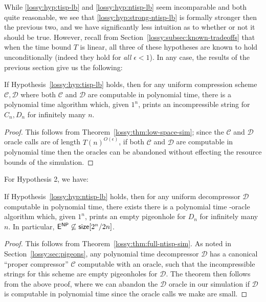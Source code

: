 While \ref{lossy:hyp:tisp-lb} and \ref{lossy:hyp:ntisp-lb} seem incomparable and both quite reasonable, we see that \ref{lossy:hyp:strong-ntisp-lb} is formally stronger then the previous two, and we have significantly less intuition as to whether or not it should be true. However, recall from Section~\ref{lossy:subsec:known-tradeoffs} that when the time bound $T$ is linear, all three of these hypotheses are known to hold unconditionally (indeed they hold for \emph{all} $\epsilon < 1$). In any case, the results of the previous section give us the following:
\begin{theorem}\label{lossy:thm:tisp-impl}
If Hypothesis~\ref{lossy:hyp:tisp-lb} holds, then for any uniform compression scheme $\mathcal{C},\mathcal{D}$ where both $\mathcal{C}$ and $\mathcal{D}$ are computable in polynomial time, there is a polynomial time algorithm which, given $1^n$, prints an incompressible string for $C_n,D_n$ for infinitely many $n$.
\end{theorem}
\begin{proof}
This follows from Theorem~\ref{lossy:thm:low-space-sim}; since the $\mathcal{C}$ and $\mathcal{D}$ oracle calls are of length $T(n)^{O(\epsilon)}$, if both $\mathcal{C}$ and $\mathcal{D}$ are computable in polynomial time then the oracles can be abandoned without effecting the resource bounds of the simulation.
\end{proof}
For Hypothesis 2, we have:
\begin{theorem}\label{lossy:thm:full-ntisp-impl}
If Hypothesis~\ref{lossy:hyp:ntisp-lb} holds, then for any uniform decompressor $\mathcal{D}$ computable in polynomial time, there exists there is a polynomial time -oracle algorithm which, given $1^n$, prints an empty pigeonhole for $D_n$ for infinitely many $n$. In particular, $\cl{E}^\cl{NP} \not\subseteq \cl{size}[2^n/2n]$.
\end{theorem}
\begin{proof}
This follows from Theorem~\ref{lossy:thm:full-ntisp-sim}. As noted in Section~\ref{lossy:sec:pigeons}, any polynomial time decompressor $\mathcal{D}$ has a canonical ``proper compressor'' $\mathcal{C}$ computable with an  oracle, such that the incompressible strings for this scheme are empty pigeonholes for $\mathcal{D}$. The theorem then follows from the above proof, where we can abandon the $\mathcal{D}$ oracle in our simulation if $\mathcal{D}$ is computable in polynomial time since the oracle calls we make are small.
\end{proof}

